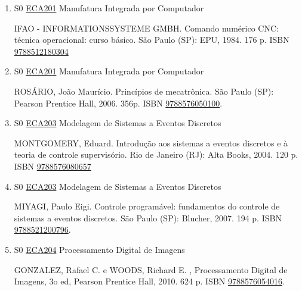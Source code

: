\documentclass[12pt,a4paper]{book}
\begin{document}
\begin{enumerate}
 BLACK, J.  T.  O Projeto da fábrica com futuro.  Porto Alegre (RS): Bookman, 2001.  288 p.    ISBN \href{http://www.bn.br/site/pages/servicosProfissionais/agenciaISBN/isbnBusca/FbnBuscaISBNCatalogo.asp?pField=ISBN&pIntPagina=1&pISBN=73073492&nidbISBN=true&hidbISBN=true}{9788573073492}
 
 
 \item S0 \hyperref[PUD:ECA201]{ECA201} Manufatura Integrada por Computador

  IFAO - INFORMATIONSSYSTEME GMBH.  Comando numérico CNC: técnica operacional: curso básico.  São Paulo (SP): EPU, 1984.  176 p.  ISBN \href{http://www.bn.br/site/pages/servicosProfissionais/agenciaISBN/isbnBusca/FbnBuscaISBNCatalogo.asp?pField=ISBN&pIntPagina=1&pISBN=12180304&nidbISBN=true&hidbISBN=true}{9788512180304}
 
 
 \item S0 \hyperref[PUD:ECA201]{ECA201} Manufatura Integrada por Computador

 ROSÁRIO, João Maurício.  Princípios de mecatrônica.  São Paulo (SP): Pearson Prentice Hall, 2006.  356p.  ISBN \href{http://www.bn.br/site/pages/servicosProfissionais/agenciaISBN/isbnBusca/FbnBuscaISBNCatalogo.asp?pField=ISBN&pIntPagina=1&pISBN=76050100&nidbISBN=true&hidbISBN=true}{9788576050100}.
 \item S0 \hyperref[PUD:ECA203]{ECA203} Modelagem de Sistemas a Eventos Discretos

 MONTGOMERY, Eduard.  Introdução aos sistemas a eventos discretos e à teoria de controle supervisório.  Rio de Janeiro (RJ): Alta Books, 2004.  120 p.  ISBN \href{http://www.bn.br/site/pages/servicosProfissionais/agenciaISBN/isbnBusca/FbnBuscaISBNCatalogo.asp?pField=ISBN&pIntPagina=1&pISBN=76080657&nidbISBN=true&hidbISBN=true}{9788576080657}
 
 
 \item S0 \hyperref[PUD:ECA203]{ECA203} Modelagem de Sistemas a Eventos Discretos

 MIYAGI, Paulo Eigi.  Controle programável: fundamentos do controle de sistemas a eventos discretos.  São Paulo (SP): Blucher, 2007.  194 p.  ISBN \href{http://www.bn.br/site/pages/servicosProfissionais/agenciaISBN/isbnBusca/FbnBuscaISBNCatalogo.asp?pField=ISBN&pIntPagina=1&pISBN=21200796&nidbISBN=true&hidbISBN=true}{9788521200796}.
 \item S0 \hyperref[PUD:ECA204]{ECA204} Processamento Digital de Imagens

 GONZALEZ, Rafael C.  e WOODS, Richard E. , Processamento Digital de Imagens, 3o ed,  Pearson Prentice Hall, 2010.  624 p.  ISBN \href{http://www.bn.br/site/pages/servicosProfissionais/agenciaISBN/isbnBusca/FbnBuscaISBNCatalogo.asp?pField=ISBN&pIntPagina=1&pISBN=76054016&nidbISBN=true&hidbISBN=true}{9788576054016}. 


\end{enumerate}
\end{document}
